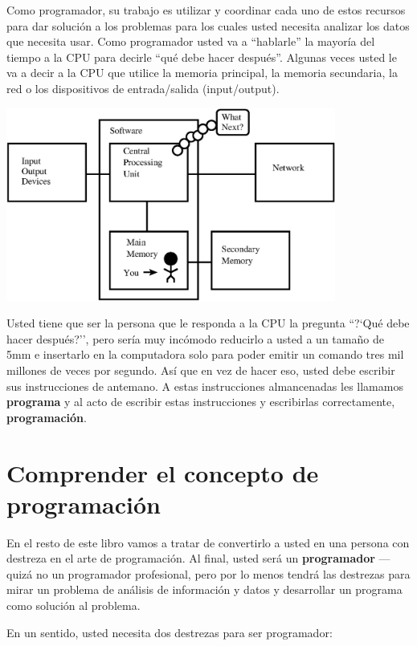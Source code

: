 Como programador, su trabajo es utilizar y coordinar cada uno de estos recursos para dar soluci\'on a los problemas para los cuales usted necesita analizar los datos que necesita usar. Como programador usted va a ``hablarle'' la mayor\'ia del tiempo a la CPU para decirle ``qu\'e debe hacer despu\'es''. Algunas veces usted le va a decir a la CPU que utilice la memoria principal, la memoria secundaria, la red o los dispositivos de entrada/salida (input/output).

\beforefig
\centerline{\includegraphics[height=2.50in]{figs2/arch2.eps}}
\afterfig

Usted tiene que ser la persona que le responda a la CPU la pregunta ``?`Qu\'e debe hacer despu\'es?'', pero ser\'ia muy inc\'omodo reducirlo a usted a un tama\~no de 5mm e insertarlo en la computadora solo para poder emitir un comando tres mil millones de veces por segundo. As\'i que en vez de hacer eso, usted debe escribir sus instrucciones de antemano.
A estas instrucciones almancenadas les llamamos {\bf programa} y al acto de escribir estas instrucciones y escribirlas correctamente, {\bf programaci\'on}.

\section{Comprender el concepto de programaci\'on}

En el resto de este libro vamos a tratar de convertirlo a usted en una persona
con destreza en el arte de programaci\'on. Al final, usted ser\'a un 
{\bf programador} --- quiz\'a no un programador profesional, pero por lo menos tendr\'a las destrezas para mirar un problema de an\'alisis de informaci\'on y datos y desarrollar un programa como soluci\'on al problema.


En un sentido, usted necesita dos destrezas para ser programador:

